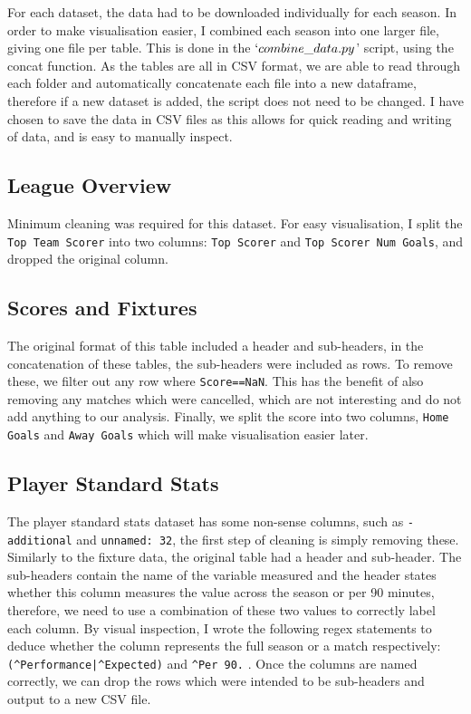 \documentclass[12pt, a4paper, twocolumn]{article}
\begin{document}
For each dataset, the data had to be downloaded individually for each season. In order to make visualisation easier, I combined each season into one larger file, giving one file per table. This is done in the $`combine\_data.py$' script, using the concat function. As the tables are all in CSV format, we are able to read through each folder and automatically concatenate each file into a new dataframe, therefore if a new dataset is added, the script does not need to be changed. I have chosen to save the data in CSV files as this allows for quick reading and writing of data, and is easy to manually inspect.

\subsection{League Overview}

Minimum cleaning was required for this dataset. For easy visualisation, I split the \verb|Top Team Scorer| into two columns: \verb|Top Scorer| and \verb|Top Scorer Num Goals|, and dropped the original column.

\subsection{Scores and Fixtures}

The original format of this table included a header and sub-headers, in the concatenation of these tables, the sub-headers were included as rows. To remove these, we filter out any row where \verb|Score==NaN|. This has the benefit of also removing any matches which were cancelled, which are not interesting and do not add anything to our analysis. Finally, we split the score into two columns, \verb|Home Goals| and \verb|Away Goals| which will make visualisation easier later.

\subsection{Player Standard Stats}

The player standard stats dataset has some non-sense columns, such as \verb|-additional| and \verb|unnamed: 32|, the first step of cleaning is simply removing these. Similarly to the fixture data, the original table had a header and sub-header. The sub-headers contain the name of the variable measured and the header states whether this column measures the value across the season or per 90 minutes, therefore, we need to use a combination of these two values to correctly label each column. By visual inspection, I wrote the following regex statements to deduce whether the column represents the full season or a match respectively: \verb=(^Performance|^Expected)= and \verb=^Per 90.= . Once the columns are named correctly, we can drop the rows which were intended to be sub-headers and output to a new CSV file.
\end{document}
